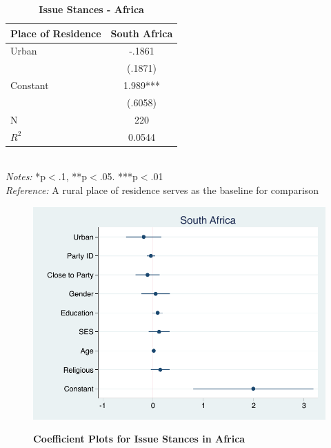 \documentclass[12pt, titlepage]{article}
\newcommand\e{\emph}
\newcommand\tb{\textbf}
\begin{document}
\begin{singlespace}
	\begin{table}[H]
		\centering
		\caption{\tb{Issue Stances - Africa}}
		\begin{tabulary}{\linewidth}{l c}

			\hline
			\tb{Place of Residence}& \tb{South Africa} \\
			\hline
			Urban&-.1861 \\
			&(.1871)\\
			Constant&1.989*** \\
			& (.6058) \\
			N& 220\\
			$R^2$&0.0544 \\
			\hline
		\end{tabulary}
		\\
		\e{Notes:} *p$<$.1, **p$<$.05. ***p$<$.01 \\
		\e{Reference:} A rural place of residence serves as the baseline for comparison
		\label{AfricaLib}
	\end{table}
\end{singlespace}

\begin{figure}[H]    \centering
	{	 \includegraphics[width=.5\textwidth]{LibCoef/SAfrica}}
	\caption[ \tb{Issue Stances - Africa} ]
	{\tb {Coefficient Plots for Issue Stances in Africa} }
	\label{AfricaLibCoef}
\end{figure}
\end{document}
